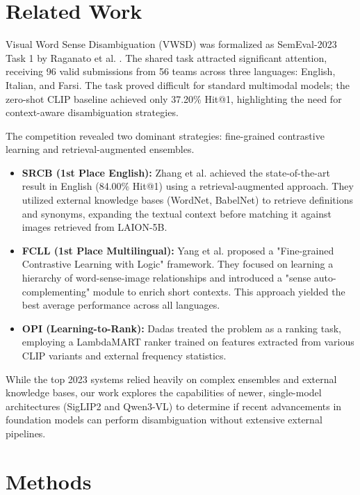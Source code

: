 \documentclass[11pt]{article}
\begin{document}
\section{Related Work}
Visual Word Sense Disambiguation (VWSD) was formalized as SemEval-2023 Task 1 by Raganato et al. \cite{raganato2023semeval}. The shared task attracted significant attention, receiving 96 valid submissions from 56 teams across three languages: English, Italian, and Farsi. The task proved difficult for standard multimodal models; the zero-shot CLIP baseline achieved only 37.20\% Hit@1, highlighting the need for context-aware disambiguation strategies.

The competition revealed two dominant strategies: fine-grained contrastive learning and retrieval-augmented ensembles.
\begin{itemize}
    \item \textbf{SRCB (1st Place English):} Zhang et al. \cite{zhang2023srcb} achieved the state-of-the-art result in English (84.00\% Hit@1) using a retrieval-augmented approach. They utilized external knowledge bases (WordNet, BabelNet) to retrieve definitions and synonyms, expanding the textual context before matching it against images retrieved from LAION-5B.
    \item \textbf{FCLL (1st Place Multilingual):} Yang et al. \cite{yang2023fcll} proposed a "Fine-grained Contrastive Learning with Logic" framework. They focused on learning a hierarchy of word-sense-image relationships and introduced a "sense auto-complementing" module to enrich short contexts. This approach yielded the best average performance across all languages.
    \item \textbf{OPI (Learning-to-Rank):} Dadas \cite{dadas2023opi} treated the problem as a ranking task, employing a LambdaMART ranker trained on features extracted from various CLIP variants and external frequency statistics.
\end{itemize}

While the top 2023 systems relied heavily on complex ensembles and external knowledge bases, our work explores the capabilities of newer, single-model architectures (SigLIP2 and Qwen3-VL) to determine if recent advancements in foundation models can perform disambiguation without extensive external pipelines.


\section{Methods}
\label{sec:methods}
\end{document}

